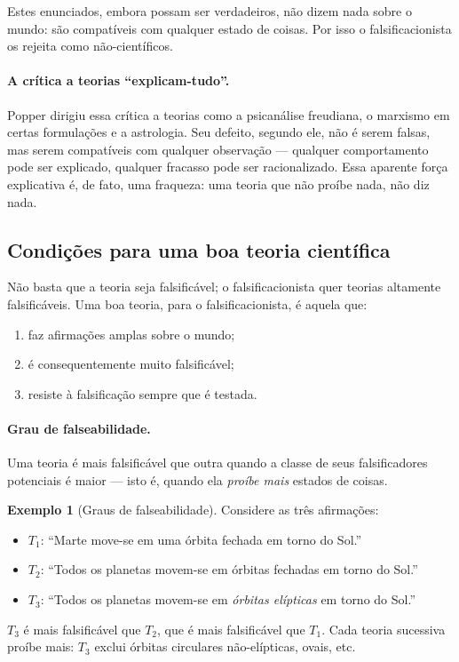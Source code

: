 \documentclass[9pt,a4paper]{extarticle}
\newcommand{\impt}[1]{\textcolor{important}{#1}}
\theoremstyle{definition}
\newtheorem{example}{Exemplo}[section]
\begin{document}
Estes enunciados, embora possam ser verdadeiros, \impt{não dizem nada sobre o mundo}: são compatíveis com qualquer estado de coisas. Por isso o falsificacionista os rejeita como não-científicos.

\paragraph{A crítica a teorias ``explicam-tudo''.}
Popper dirigiu essa crítica a teorias como a psicanálise freudiana, o marxismo em certas formulações e a astrologia. Seu defeito, segundo ele, não é serem falsas, mas serem \impt{compatíveis com qualquer observação} --- qualquer comportamento pode ser explicado, qualquer fracasso pode ser racionalizado. Essa aparente força explicativa é, de fato, uma fraqueza: uma teoria que não proíbe nada, não diz nada.

\subsection{Condições para uma boa teoria científica}

Não basta que a teoria seja falsificável; o falsificacionista quer teorias \impt{altamente falsificáveis}. Uma boa teoria, para o falsificacionista, é aquela que:

\begin{enumerate}
  \item faz afirmações amplas sobre o mundo;
  \item é consequentemente muito falsificável;
  \item resiste à falsificação sempre que é testada.
\end{enumerate}

\paragraph{Grau de falseabilidade.}
Uma teoria é \impt{mais falsificável} que outra quando a classe de seus falsificadores potenciais é maior --- isto é, quando ela \emph{proíbe mais} estados de coisas.

\begin{example}[Graus de falseabilidade]
Considere as três afirmações:
\begin{itemize}
  \item $T_1$: ``Marte move-se em uma órbita fechada em torno do Sol.''
  \item $T_2$: ``Todos os planetas movem-se em órbitas fechadas em torno do Sol.''
  \item $T_3$: ``Todos os planetas movem-se em \emph{órbitas elípticas} em torno do Sol.''
\end{itemize}
$T_3$ é mais falsificável que $T_2$, que é mais falsificável que $T_1$. Cada teoria sucessiva proíbe mais: $T_3$ exclui órbitas circulares não-elípticas, ovais, etc.
\end{example}
\end{document}
